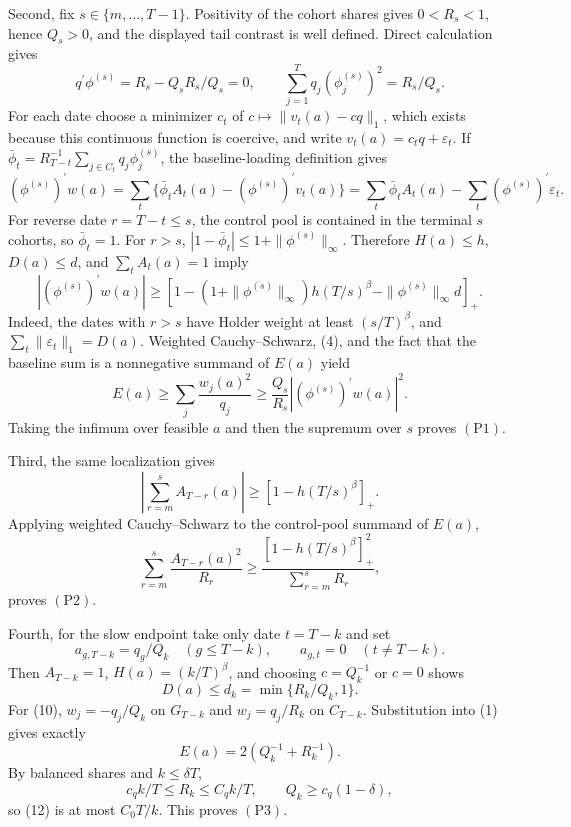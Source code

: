 Second, fix \(s\in\{m,\ldots,T-1\}\).  Positivity of the cohort shares gives \(0<R_s<1\), hence \(Q_s>0\), and the displayed tail contrast is well defined.  Direct calculation gives
\[
 q^{\prime}\phi^{(s)}=R_s-Q_sR_s/Q_s=0,
 \qquad
 \sum_{j=1}^Tq_j(\phi^{(s)}_j)^2=R_s/Q_s.                        \tag{4}
\]
For each date choose a minimizer \(c_t\) of \(c\mapsto\|v_t(a)-cq\|_1\), which exists because this continuous function is coercive, and write \(v_t(a)=c_tq+\varepsilon_t\).  If \(\bar\phi_t=R_{T-t}^{-1}\sum_{j\in C_t}q_j\phi^{(s)}_j\), the baseline-loading definition gives
\[
 (\phi^{(s)})^{\prime}w(a)
 =\sum_t\{\bar\phi_tA_t(a)-(\phi^{(s)})^{\prime}v_t(a)\}
 =\sum_t\bar\phi_tA_t(a)-\sum_t(\phi^{(s)})^{\prime}\varepsilon_t. \tag{5}
\]
For reverse date \(r=T-t\le s\), the control pool is contained in the terminal \(s\) cohorts, so \(\bar\phi_t=1\).  For \(r>s\), \(|1-\bar\phi_t|\le1+\|\phi^{(s)}\|_\infty\).  Therefore \(H(a)\le h\), \(D(a)\le d\), and \(\sum_tA_t(a)=1\) imply
\[
 |(\phi^{(s)})^{\prime}w(a)|
 \ge\left[
 1-(1+\|\phi^{(s)}\|_\infty)h(T/s)^\beta
   -\|\phi^{(s)}\|_\infty d
 \right]_+.                                                       \tag{6}
\]
Indeed, the dates with \(r>s\) have Holder weight at least \((s/T)^\beta\), and \(\sum_t\|\varepsilon_t\|_1=D(a)\).  Weighted Cauchy--Schwarz, (4), and the fact that the baseline sum is a nonnegative summand of \(E(a)\) yield
\[
 E(a)\ge\sum_j\frac{w_j(a)^2}{q_j}
 \ge\frac{Q_s}{R_s}|(\phi^{(s)})^{\prime}w(a)|^2.                \tag{7}
\]
Taking the infimum over feasible \(a\) and then the supremum over \(s\) proves \((\mathrm{P1})\).

Third, the same localization gives
\[
 \left|\sum_{r=m}^sA_{T-r}(a)\right|
 \ge[1-h(T/s)^\beta]_+ .                                        \tag{8}
\]
Applying weighted Cauchy--Schwarz to the control-pool summand of \(E(a)\),
\[
 \sum_{r=m}^s\frac{A_{T-r}(a)^2}{R_r}
 \ge\frac{[1-h(T/s)^\beta]_+^2}{\sum_{r=m}^sR_r},               \tag{9}
\]
proves \((\mathrm{P2})\).

Fourth, for the slow endpoint take only date \(t=T-k\) and set
\[
 a_{g,T-k}=q_g/Q_k\quad(g\le T-k),
 \qquad a_{g,t}=0\quad(t\ne T-k).                               \tag{10}
\]
Then \(A_{T-k}=1\), \(H(a)=(k/T)^\beta\), and choosing \(c=Q_k^{-1}\) or \(c=0\) shows
\[
 D(a)\le d_k=\min\{R_k/Q_k,1\}.                                \tag{11}
\]
For (10), \(w_j=-q_j/Q_k\) on \(G_{T-k}\) and \(w_j=q_j/R_k\) on \(C_{T-k}\).  Substitution into (1) gives exactly
\[
 E(a)=2(Q_k^{-1}+R_k^{-1}).                                     \tag{12}
\]
By balanced shares and \(k\le\delta T\),
\[
 c_qk/T\le R_k\le C_qk/T,
 \qquad Q_k\ge c_q(1-\delta),                                  \tag{13}
\]
so (12) is at most \(C_0T/k\).  This proves \((\mathrm{P3})\).


